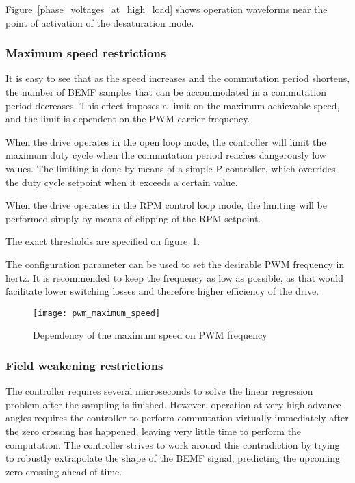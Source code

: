 \documentclass{zubaxdoc}
\begin{document}
Figure~\ref{phase_voltages_at_high_load} shows operation waveforms near the point of activation
of the desaturation mode.

\subsubsection{Maximum speed restrictions}

It is easy to see that as the speed increases and the commutation period shortens,
the number of BEMF samples that can be accommodated in a commutation period decreases.
This effect imposes a limit on the maximum achievable speed,
and the limit is dependent on the PWM carrier frequency.

When the drive operates in the open loop mode, the controller will limit the maximum duty cycle
when the commutation period reaches dangerously low values.
The limiting is done by means of a simple P-controller,
which overrides the duty cycle setpoint when it exceeds a certain value.

When the drive operates in the RPM control loop mode, the limiting will be performed simply by means of
clipping of the RPM setpoint.

The exact thresholds are specified on figure~\ref{pwm_maximum_speed}.

The configuration parameter  can be used to set the desirable PWM frequency
in hertz.
It is recommended to keep the frequency as low as possible,
as that would facilitate lower switching losses and therefore higher efficiency of the drive.

\begin{figure}[hbt]
	\centering
	\texttt{[image: pwm\_maximum\_speed]}
	\caption{Dependency of the maximum speed on PWM frequency
		\label{pwm_maximum_speed}}
\end{figure}

\subsubsection{Field weakening restrictions}

The controller requires several microseconds to solve the linear regression problem after the sampling is
finished.
However, operation at very high advance angles requires the controller to perform commutation virtually
immediately after the zero crossing has happened, leaving very little time to perform the computation.
The controller strives to work around this contradiction by trying to robustly extrapolate the shape of the
BEMF signal, predicting the upcoming zero crossing ahead of time.
\end{document}
